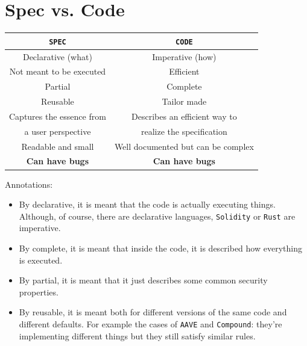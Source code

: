 \documentclass[oneside]{book}
\begin{document}
    \pagebreak

    \section{Spec vs. Code}

    \begin{table}[htbp!]
        \centering
        \begin{tabular}{|c|c|}
            \hline
            \texttt{SPEC}&\texttt{CODE}\\
            \hline
            Declarative (what)&Imperative (how)\\
            \hline
            Not meant to be executed&Efficient\\
            \hline
            Partial&Complete\\
            \hline
            Reusable&Tailor made\\
            \hline
            Captures the essence from & Describes an efficient way to\\
            a user perspective & realize the specification\\
            \hline
            Readable and small&Well documented but can be complex\\
            \hline
            \textbf{Can have bugs}&\textbf{Can have bugs}\\
            \hline
        \end{tabular}
    \end{table}

    Annotations:

    \begin{itemize}
        \item By declarative, it is meant that the code is actually executing things.
            Although, of course, there are declarative languages, \texttt{Solidity} or \texttt{Rust} are imperative.
        \item By complete, it is meant that inside the code, it is described how everything is executed.
        \item By partial, it is meant that it just describes some common security properties.
        \item By reusable, it is meant both for different versions of the same code and different defaults.
            For example the cases of \texttt{AAVE} and \texttt{Compound}: they're implementing different things but they still satisfy similar rules.
    \end{itemize}
\end{document}
